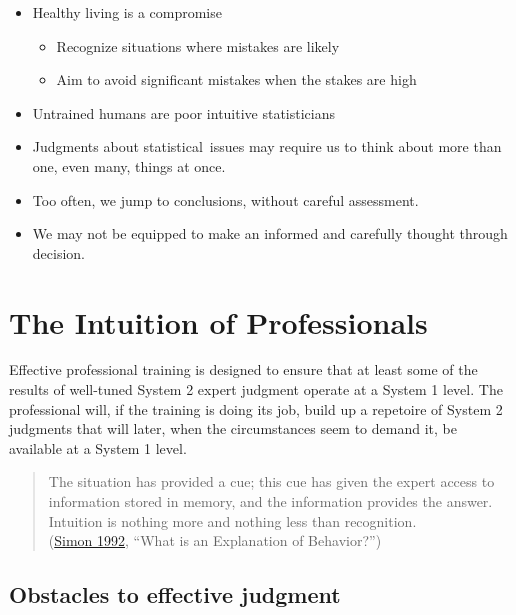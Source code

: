 \documentclass[
  10pt,
  b5paper]{book}
\providecommand{\tightlist}{%
  \setlength{\itemsep}{0pt}\setlength{\parskip}{0pt}}
\begin{document}
\begin{itemize}
\tightlist
\item
  Healthy living is a compromise

  \begin{itemize}
  \tightlist
  \item
    Recognize situations where mistakes are likely
  \item
    Aim to avoid significant mistakes when the stakes are high
  \end{itemize}
\item
  Untrained humans are poor intuitive statisticians
\item
  Judgments about statistical~issues may require us to think about more than one, even many, things at once.
\item
  Too often, we jump to conclusions, without careful assessment.
\item
  We may not be equipped to make an informed and carefully thought through decision.
\end{itemize}

\hypertarget{the-intuition-of-professionals}{%
\section{The Intuition of Professionals}\label{the-intuition-of-professionals}}

Effective professional training is designed to ensure that at least some of the results of well-tuned System 2 expert judgment operate at a System 1 level.
The professional will, if the training is doing its job, build up a
repetoire of System 2 judgments that will later, when the circumstances
seem to demand it, be available at a System 1 level.

\begin{quote}
The situation has provided a cue; this cue has given the expert access to information stored in memory, and the information provides the answer. Intuition is nothing more and nothing less than recognition.\\
(\protect\hyperlink{ref-simon1992explanation}{Simon 1992}, ``What is an Explanation of Behavior?'')
\end{quote}

\hypertarget{obstacles-to-effective-judgment}{%
\subsection*{Obstacles to effective judgment}\label{obstacles-to-effective-judgment}}
\end{document}
